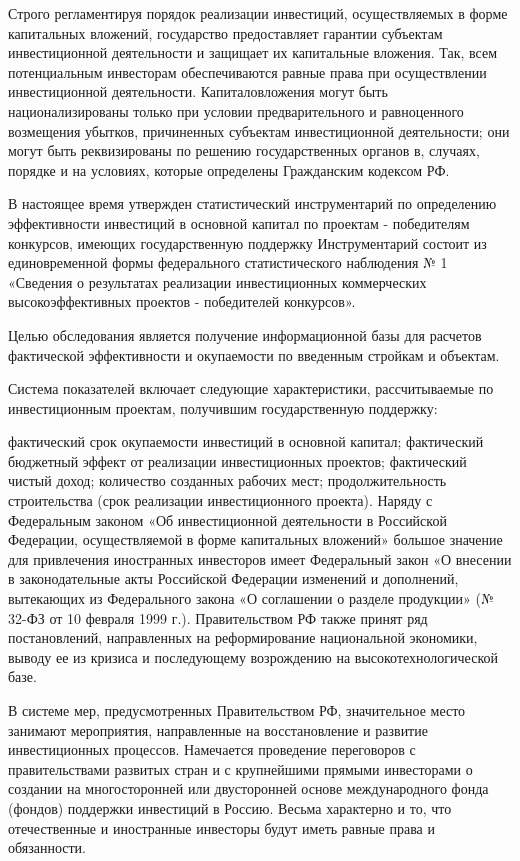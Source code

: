 Строго регламентируя порядок реализации инвестиций, осуществляемых в форме капитальных вложений, государство предоставляет гарантии субъектам инвестиционной деятельности и защищает их капитальные вложения. Так, всем потенциальным инвесторам обеспечиваются равные права при осуществлении инвестиционной деятельности. Капиталовложения могут быть национализированы только при условии предварительного и равноценного возмещения убытков, причиненных субъектам инвестиционной деятельности; они могут быть реквизированы по решению государственных органов в, случаях, порядке и на условиях, которые определены Гражданским кодексом РФ.

В настоящее время утвержден статистический инструментарий по определению эффективности инвестиций в основной капитал по проектам - победителям конкурсов, имеющих государственную поддержку Инструментарий состоит из единовременной формы федерального статистического наблюдения № 1 «Сведения о результатах реализации инвестиционных коммерческих высокоэффективных проектов - победителей конкурсов».

Целью обследования является получение информационной базы для расчетов фактической эффективности и окупаемости по введенным стройкам и объектам.

Система показателей включает следующие характеристики, рассчитываемые по инвестиционным проектам, получившим государственную поддержку:

фактический срок окупаемости инвестиций в основной капитал;
фактический бюджетный эффект от реализации инвестиционных проектов;
фактический чистый доход;
количество созданных рабочих мест;
продолжительность строительства (срок реализации инвестиционного проекта).
Наряду с Федеральным законом «Об инвестиционной деятельности в Российской Федерации, осуществляемой в форме капитальных вложений» большое значение для привлечения иностранных инвесторов имеет Федеральный закон «О внесении в законодательные акты Российской Федерации изменений и дополнений, вытекающих из Федерального закона «О соглашении о разделе продукции» (№ 32-ФЗ от 10 февраля 1999 г.). Правительством РФ также принят ряд постановлений, направленных на реформирование национальной экономики, выводу ее из кризиса и последующему возрождению на высокотехнологической базе.

В системе мер, предусмотренных Правительством РФ, значительное место занимают мероприятия, направленные на восстановление и развитие инвестиционных процессов. Намечается проведение переговоров с правительствами развитых стран и с крупнейшими прямыми инвесторами о создании на многосторонней или двусторонней основе международного фонда (фондов) поддержки инвестиций в Россию. Весьма характерно и то, что отечественные и иностранные инвесторы будут иметь равные права и обязанности.

